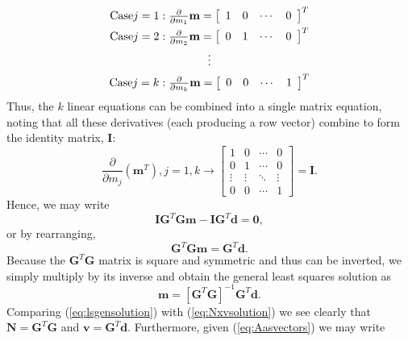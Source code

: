 \[\begin{array}{*{20}{c}}
{{\rm{Case }}j = 1:{\frac{\partial}{\partial m_1}\mathbf{m}} = {{\left[ {\begin{array}{*{20}{c}}
1&0& \cdots &0
\end{array}} \right]}^T}}\\[4pt]
{{\rm{Case }}j = 2:{\frac{\partial}{\partial m_2}\mathbf{m}} = {{\left[ {\begin{array}{*{20}{c}}
0&1& \cdots &0
\end{array}} \right]}^T}}\\[4pt]
 \vdots \\[4pt]
{{\rm{Case }}j = k:{\frac{\partial}{\partial m_k}\mathbf{m}} = {{\left[ {\begin{array}{*{20}{c}}
0&0& \cdots &1
\end{array}} \right]}^T}}
\end{array}\]
Thus, the $k$ linear equations can be combined into a single matrix equation, noting that all these derivatives (each producing a row vector)
combine to form the identity matrix, $\mathbf{I}$:
\begin{equation}
\frac{\partial }{{\partial {m_j}}}\left( {{{{\mathbf{m}}}^T}} \right), j = 1,k \to \left[ {\begin{array}{*{20}{c}}
1&0& \cdots &0\\
0&1& \cdots &0\\
 \vdots & \vdots & \ddots & \vdots \\
0&0& \cdots &1
\end{array}} \right] = {\mathbf{I}}.
\end{equation}
Hence, we may write
\begin{equation}
\mathbf{I}\mathbf{G}^T\mathbf{Gm} - \mathbf{I}\mathbf{G}^T\mathbf{d} = \mathbf{0},
\end{equation}
or by rearranging,
\begin{equation}
\mathbf{G}^T\mathbf{Gm} = \mathbf{G}^T\mathbf{d}.
\end{equation}
Because the $\mathbf{G}^T\mathbf{G}$ matrix is square and symmetric and thus can be inverted, we simply multiply by its inverse
and obtain the general least squares solution as
\begin{equation}
\mathbf{m} = \left [\mathbf{G}^T\mathbf{G}\right ]^{-1}\mathbf{G}^T\mathbf{d}.
\label{eq:lsgensolution}
\end{equation}
Comparing (\ref{eq:lsgensolution}) with (\ref{eq:Nxvsolution}) we see clearly that $\mathbf{N} = \mathbf{G}^T\mathbf{G}$
and $\mathbf{v} = \mathbf{G}^T\mathbf{d}$.  Furthermore, given (\ref{eq:Aasvectors}) we may write
